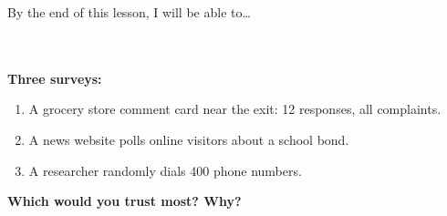 \documentclass[10pt]{article}
\begin{document}
\namedateperiod

\vspace{0.12in}

\begin{objectivebox}
\small By the end of this lesson, I will be able to\dots\\[4pt]
\writeline\\[1pt]
\writeline\\[1pt]
\writeline
\end{objectivebox}

\vspace{0.1in}

\begin{vocabbox}
\end{vocabbox}

\vspace{0.1in}

\begin{hookbox}
\small\textbf{Three surveys:}
\begin{enumerate}[leftmargin=1.5em, itemsep=4pt]
  \item A grocery store comment card near the exit: 12 responses, all complaints.
  \item A news website polls online visitors about a school bond.
  \item A researcher randomly dials 400 phone numbers.
\end{enumerate}
\textbf{Which would you trust most? Why?}\\[4pt]
\writeline\\[1pt]\writeline
\end{hookbox}

\vspace{0.1in}
\end{document}

